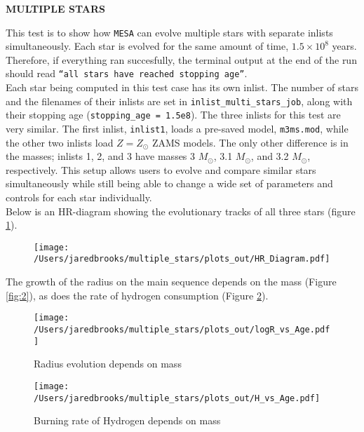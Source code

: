 \documentclass{article}
\begin{document}
	
	\begin{center}
		\begin{Large}
		  \textbf{MULTIPLE STARS}\\
		\end{Large}
	\end{center}
	
        This test is to show how \texttt{MESA} can evolve multiple stars with separate inlists simultaneously.  Each star is evolved for the same amount of time, $1.5\times10^8$ years.  Therefore, if everything ran succesfully, the terminal output at the end of the run should read \texttt{``all stars have reached stopping age''}.\\

        Each star being computed in this test case has its own inlist.  The number of stars and the filenames of their inlists are set in \texttt{inlist\_multi\_stars\_job}, along with their stopping age (\texttt{stopping\_age = 1.5e8}).  The three inlists for this test are very similar.  The first inlist, \texttt{inlist1}, loads a pre-saved model, \texttt{m3ms.mod}, while the other two inlists load $Z=Z_\odot$ ZAMS models.  The only other difference is in the masses; inlists 1, 2, and 3 have masses 3 $M_\odot$, 3.1 $M_\odot$, and 3.2 $M_\odot$, respectively.   This setup allows users to evolve and compare similar stars simultaneously while still being able to change a wide set of parameters and controls for each star individually.\\

        Below is an HR-diagram showing the evolutionary tracks of all three stars (figure \ref{fig:1}).

        \begin{figure}[H]
                \centering
                \texttt{[image: /Users/jaredbrooks/multiple\_stars/plots\_out/HR\_Diagram.pdf]}
                \caption{}
                \label{fig:1}
        \end{figure}

        \pagebreak

        The growth of the radius on the main sequence depends on the mass (Figure \ref{fig:2}), as does the rate of hydrogen consumption (Figure \ref{fig:3}).

        \begin{figure}[H]
                \begin{minipage}[b]{0.5\linewidth}
		       \centering
		       \texttt{[image: /Users/jaredbrooks/multiple\_stars/plots\_out/logR\_vs\_Age.pdf]}
		       \caption{Radius evolution depends on mass}
		       \label{fig:2}
                \end{minipage}
                \hspace{0cm}
                \begin{minipage}[b]{0.5\linewidth}
                       \centering
                       \texttt{[image: /Users/jaredbrooks/multiple\_stars/plots\_out/H\_vs\_Age.pdf]}
                       \caption{Burning rate of Hydrogen depends on mass}
                       \label{fig:3}
                \end{minipage}
	\end{figure}
\end{document}
